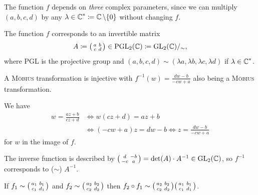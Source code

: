 \documentclass[a4paper,english]{article}
\begin{document}
\begin{remark}
    The function $f$ depends on \emph{three} complex parameters, since we can multiply $(a, b, c, d)$ by any $\lambda \in \operatorname{\mathbb{C}}^* \coloneqq \operatorname{\mathbb{C}} \setminus \{ 0 \}$ without changing $f$.
    
    The function $f$ corresponds to an invertible matrix
    \begin{equation*}
        A
        \coloneqq \begin{psmallmatrix} a & b \\ c & d \end{psmallmatrix}
        \in \operatorname{PGL}_2(\operatorname{\mathbb{C}})
        \coloneqq \operatorname{GL}_2(\operatorname{\mathbb{C}}) /_{\sim},
    \end{equation*}
    where PGL is the projective group and $(a, b, c, d) \sim (\lambda a, \lambda b, \lambda c, \lambda d)$ if $\lambda \in \operatorname{\mathbb{C}}^*$.
\end{remark}

\begin{lemma}
    A \textsc{Möbius} transformation is injective with $f^{-1}(w) = \frac{d w - b}{- c w + a}$ also being a \textsc{Möbius} transformation.
\end{lemma}

\begin{pr}
    We have
    \begin{align*}
        w = \frac{a z + b}{c z + d}
        & \iff w ( c z + d) = a z + b \\
        & \iff (- c w + a) z = d w - b
        \iff z = \frac{d w - b}{- c w + a}
    \end{align*}
    for $w$ in the image of $f$.
\end{pr}

\begin{remark}
    The inverse function is described by $\begin{psmallmatrix} d & - b \\ -c & a \end{psmallmatrix} = \det(A) \cdot A^{-1} \in \operatorname{GL}_2(\operatorname{\mathbb{C}})$, so $f^{-1}$ corresponds to ($\sim$) $A^{-1}$.
\end{remark}

\begin{lemma}
    If $f_1 \sim \begin{psmallmatrix} a_1 & b_1 \\ c_1 & d_1 \end{psmallmatrix}$ and $f_2 \sim \begin{psmallmatrix} a_2 & b_2 \\ c_2 & d_2 \end{psmallmatrix}$ then $f_2 \circ f_1 \sim \begin{psmallmatrix} a_2 & b_2 \\ c_2 & d_2 \end{psmallmatrix} \begin{psmallmatrix} a_1 & b_1 \\ c_1 & d_1 \end{psmallmatrix}$.
\end{lemma}
\end{document}
